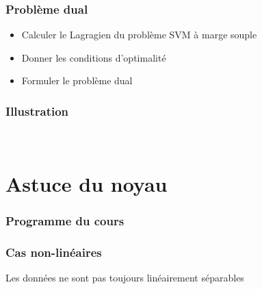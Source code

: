 \documentclass[9pt,table]{beamer} %
\begin{document}
\begin{frame}
\frametitle{Problème dual}

\begin{itemize}
	\item[1.] Calculer le Lagragien du problème SVM à marge souple
	\item[2.] Donner les conditions d'optimalité
	\item[3.] Formuler le problème dual
\end{itemize}
\end{frame}



\begin{frame}
\frametitle{Illustration}

\begin{figure}
	\captionsetup[subfigure]{labelformat=empty}
	\subfloat[$\al=0.02$]{}
	\quad
	\subfloat[$\al=0.07$]{}
	\\
	\subfloat[$\al=0.2$]{}
	\quad
	\subfloat[$\al=0.7$]{}
\end{figure}
\end{frame}


\section{Astuce du noyau}

\begin{frame}
\frametitle{Programme du cours}
\tableofcontents[currentsection]
\end{frame}


\begin{frame}
\frametitle{Cas non-linéaires}

Les données ne sont pas toujours linéairement séparables

\begin{figure}
	
	
\end{figure}

\end{frame}
\end{document}
